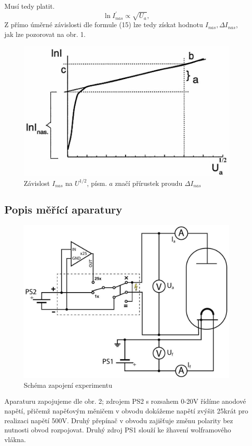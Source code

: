 \documentclass[czech,11pt,a4paper]{article}
\begin{document}
\begin{multicols}{2}
		Musí tedy platit. 
		\begin{equation}
			\ln I^\prime_{nas} \propto \sqrt{U_a},
		\end{equation}
		Z přímo úměrné závislosti dle formule (15) lze tedy získat hodnotu $I_{nas}, \Delta I_{nas}$, jak lze pozorovat na obr. 1.
		\begin{figure}[H]
			\centering
			\includegraphics[width=0.7\linewidth]{primaumera}
			\caption{Závislost $I_{nas}$ na $U^{1/2}$, písm. $a$ značí přírustek proudu $\Delta I_{nas}$}
			\label{fig:primaumera}
		\end{figure}
		
		\subsection{Popis měřící aparatury}
		\begin{figure}[H]
			\centering
			\includegraphics[width=0.7\linewidth]{zapojeni}
			\caption{Schéma zapojení experimentu}
			\label{fig:zapojeni}
		\end{figure}
		Aparaturu zapojujeme dle obr. 2; zdrojem PS2 s rozsahem 0-20V řídíme anodové napětí, přičemž napěťovým měničem v obvodu dokážeme napětí zvýšit 25krát pro realizaci napětí 500V. Druhý přepínač v obvodu zajišťuje změnu polarity bez nutnosti obvod rozpojovat. Druhý zdroj PS1 slouží ke žhavení wolframového vlákna.
		\newpage
		

\end{multicols}
\end{document}
